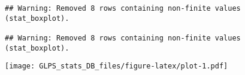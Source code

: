 \documentclass[
]{article}
\newenvironment{Shaded}{\begin{snugshade}}{\end{snugshade}}
\newcommand{\CommentTok}[1]{\textcolor[rgb]{0.56,0.35,0.01}{\textit{#1}}}
\newcommand{\FunctionTok}[1]{\textcolor[rgb]{0.00,0.00,0.00}{#1}}
\newcommand{\NormalTok}[1]{#1}
\newcommand{\OtherTok}[1]{\textcolor[rgb]{0.56,0.35,0.01}{#1}}
\newcommand{\SpecialCharTok}[1]{\textcolor[rgb]{0.00,0.00,0.00}{#1}}
\newcommand{\StringTok}[1]{\textcolor[rgb]{0.31,0.60,0.02}{#1}}
\begin{document}
\begin{verbatim}
## Warning: Removed 8 rows containing non-finite values (stat_boxplot).

## Warning: Removed 8 rows containing non-finite values (stat_boxplot).
\end{verbatim}

\texttt{[image: GLPS\_stats\_DB\_files/figure-latex/plot-1.pdf]}

\begin{Shaded}
\end{Shaded}
\end{document}
